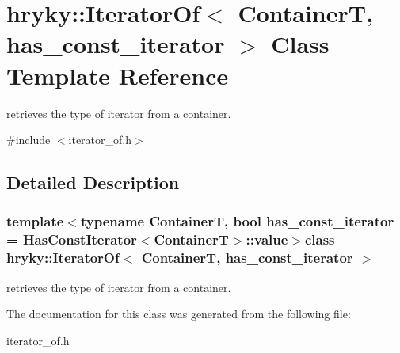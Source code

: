 \hypertarget{classhryky_1_1_iterator_of}{\section{hryky\-:\-:Iterator\-Of$<$ Container\-T, has\-\_\-const\-\_\-iterator $>$ Class Template Reference}
\label{classhryky_1_1_iterator_of}
}


retrieves the type of iterator from a container.  




{\ttfamily \#include $<$iterator\-\_\-of.\-h$>$}



\subsection{Detailed Description}
\subsubsection*{template$<$typename Container\-T, bool has\-\_\-const\-\_\-iterator = Has\-Const\-Iterator$<$\-Container\-T$>$\-::value$>$class hryky\-::\-Iterator\-Of$<$ Container\-T, has\-\_\-const\-\_\-iterator $>$}

retrieves the type of iterator from a container. 

The documentation for this class was generated from the following file\-:\begin{DoxyCompactItemize}
\item 
iterator\-\_\-of.\-h\end{DoxyCompactItemize}
